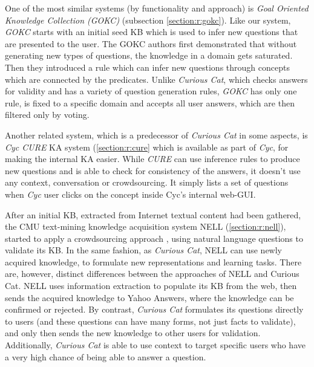 One of the most similar systems (by functionality and approach) is 
\emph{Goal Oriented Knowledge Collection (GOKC)} (subsection \ref{section:r:gokc}). 
Like our system, \emph{GOKC} starts with an initial seed KB which is used 
to infer new questions that are presented to the user. The GOKC authors first 
demonstrated that without generating new types of questions, the knowledge in 
a domain gets saturated. Then they introduced a rule which can infer new 
questions through concepts which are connected by the predicates. Unlike 
\emph{Curious Cat}, which checks answers for validity and has a variety of 
question generation rules, \emph{GOKC} has only one rule, is fixed to a 
specific domain and accepts all user answers, which are then filtered only by 
voting.

Another related system, which is a predecessor of \emph{Curious Cat} in some 
aspects, is \emph{Cyc CURE} KA system (\autoref{section:r:cure} which is 
available as part of \emph{Cyc}, for making the internal KA easier. While 
\emph{CURE} can use inference rules to produce new questions and is able to
check for consistency of the answers, it doesn't use any context, conversation
or crowdsourcing. It simply lists a set of questions when \emph{Cyc} user clicks
on the concept inside Cyc's internal web-GUI.

After an initial KB, extracted from Internet textual content had been gathered, 
the CMU text-mining knowledge acquisition system NELL 
(\autoref{section:r:nell}), started to apply a crowdsourcing approach
\parencite{Pedro2013}, using natural language questions to validate its KB. 
In the same fashion, as \emph{Curious Cat}, NELL can use newly acquired 
knowledge, to formulate new representations and learning tasks. There are, 
however, distinct differences between the approaches of NELL and Curious Cat. 
NELL uses information extraction to populate its KB from the web, then sends 
the acquired knowledge to Yahoo Answers, where the knowledge can be confirmed 
or rejected. By contrast, \emph{Curious Cat} formulates its questions directly 
to users (and these questions can have many forms, not just facts to validate), 
and only then sends the new knowledge to other users for validation. 
Additionally, \emph{Curious Cat} is able to use context to target specific 
users who have a very high chance of being able to answer a question.

